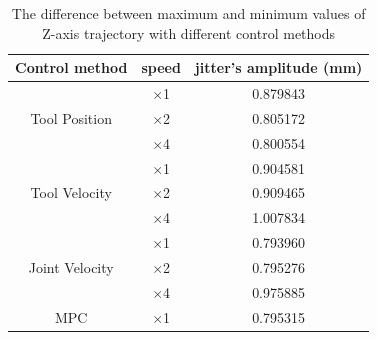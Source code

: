 \begin{table}
	\centering
	\caption{The difference between maximum and minimum values of Z-axis trajectory with different control methods}
	\begin{tabular}{|c|c|c|}
		\hline
		Control method & speed & jitter's amplitude (mm) \\
		\hline		
		& $ \times $1 & 0.879843\\
		Tool Position & $ \times $2 & 0.805172\\
		& $ \times $4 & 0.800554\\
		\hline		
		& $ \times $1 & 0.904581\\
		Tool Velocity & $ \times $2 & 0.909465\\
		& $ \times $4 & 1.007834\\
		\hline		
		& $ \times $1 & 0.793960\\
		Joint Velocity & $ \times $2 & 0.795276\\
		& $ \times $4 & 0.975885\\				
		\hline
		\ac {MPC} & $ \times $1 & 0.795315 \\
		\hline
		
	\end{tabular}
	\label{tab:z_jitter}
\end{table}


 

